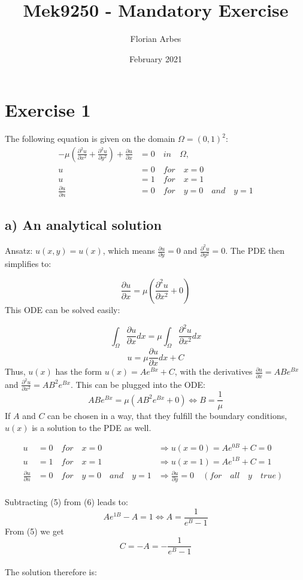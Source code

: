 \documentclass{article}
\title{Mek9250 - Mandatory Exercise}
\author{Florian Arbes}
\date{February 2021}
\begin{document}
\maketitle

\section*{Exercise 1}

The following equation is given on the domain $\Omega = (0, 1) ^2$:
\begin{align}
 - \mu \left( \frac{\partial^2 u}{\partial x^2} + \frac{\partial^2 u}{\partial y^2} \right)+ \frac{\partial u}{\partial x} &= 0 \quad in \quad  \Omega, \\
u &= 0 \quad for \quad x = 0 \\
u &= 1 \quad for \quad x = 1 \\
\frac{\partial u}{\partial n} &= 0 \quad for \quad y=0 \quad  and \quad y=1
\end{align}

\subsection*{a) An analytical solution}
Ansatz: $u(x, y) = u(x)$, which means $\frac{\partial u}{\partial y} = 0$ and  $\frac{\partial^2 u}{\partial y^2} = 0$. The PDE then simplifies to:

$$ \frac{\partial u}{\partial x} =  \mu \left( \frac{\partial^2 u}{\partial x^2} + 0 \right)$$
This ODE can be solved easily:

$$ \int_{\Omega} \frac{\partial u}{\partial x}  dx =  \mu  \int_{\Omega} \frac{\partial^2 u}{\partial x^2}  dx $$
$$ u = \mu  \frac{\partial u}{\partial x}  dx + C $$
Thus, $u(x)$ has the form $u(x) = A e^{Bx}+C$, with the derivatives $\frac{\partial u}{\partial x} = AB e^{Bx}$ and $\frac{\partial^2 u}{\partial x^2} = AB^2 e^{Bx}$. This can be plugged into the ODE:
$$AB e^{Bx} =\mu \left( AB^2 e^{Bx} +0 \right) \Leftrightarrow B = \frac{1}{\mu}$$
If $A$ and $C$ can be chosen in a way, that they fulfill the boundary conditions, $u(x)$ is a solution to the PDE as well.

\begin{align}
u &= 0  \quad for \quad x = 0  &\Rightarrow u(x=0) = A e^{0B} + C = 0\quad\quad\\
u &= 1  \quad for \quad x = 1 & \Rightarrow u(x=1) = A e^{1B} + C = 1\quad\quad\\
\frac{\partial u}{\partial n} &= 0 \quad for \quad y=0 \quad  and \quad y=1& \Rightarrow \frac{\partial u}{\partial y} = 0 \quad(for \quad all \quad y \quad true)
\end{align}
\\
Subtracting (5) from (6) leads to:
$$A e^{1B} - A = 1 \Leftrightarrow A = \frac {1}{e^B-1}$$
From (5) we get
$$C = -A = -\frac {1}{e^B-1}$$
\\
The solution therefore is:
\end{document}
